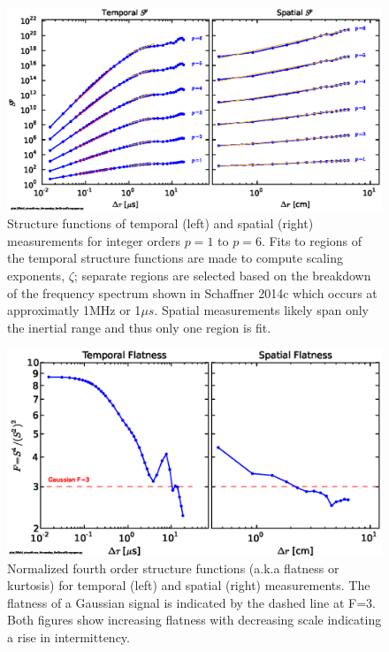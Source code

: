 \documentclass[preprint2]{aastex}
\begin{document}
\begin{figure}
\includegraphics{fig2.eps}
\caption{\label{fig:structfuncs} Structure functions of temporal (left) and spatial (right) measurements for integer orders $p=1$ to $p=6$. Fits to regions of the temporal structure functions are made to compute scaling exponents, $\zeta$; separate regions are selected based on the breakdown of the frequency spectrum shown in Schaffner 2014c which occurs at approximatly 1MHz or 1$\mu s$. Spatial measurements likely span only the inertial range and thus only one region is fit. }
\end{figure}

\begin{figure}
\includegraphics[width={\columnwidth}]{fig3.eps}
\caption{\label{fig:flatness} Normalized fourth order structure functions (a.k.a flatness or kurtosis) for temporal (left) and spatial (right) measurements. The flatness of a Gaussian signal is indicated by the dashed line at F=3. Both figures show increasing flatness with decreasing scale indicating a rise in intermittency.}
\end{figure}
\end{document}
